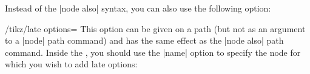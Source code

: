 Instead of the |node also| syntax, you can also use the following option:

\begin{key}{/tikz/late options=}
    This option can be given on a path (but not as an argument to a |node| path
    command) and has the same effect as the |node also| path command. Inside
    the , you should use the |name| option to specify the node
    for which you wish to add late options:
\begin{codeexample}[]
\end{codeexample}
\end{key}


